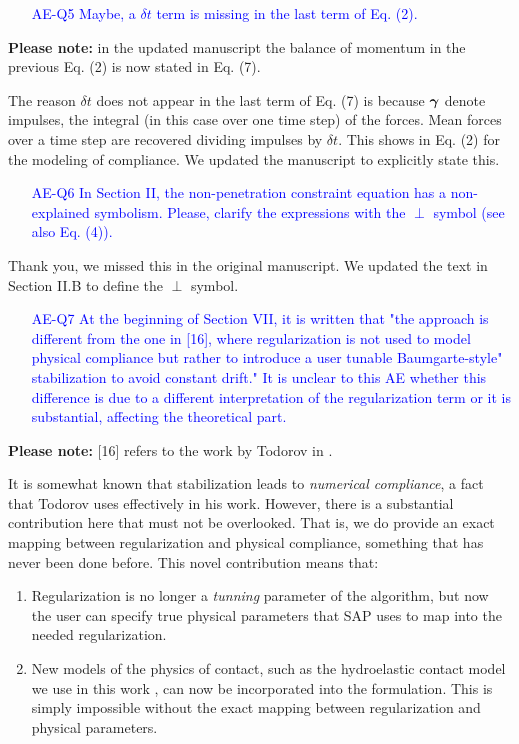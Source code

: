 \textcolor{blue}{\begin{itemize}
\item[AE-Q5] Maybe, a $\delta t$ term is missing in the last term of Eq. (2).
\end{itemize}} 

\textbf{Please note:} in the updated manuscript the balance of momentum in the
previous Eq. (2) is now stated in Eq. (7).

The reason $\delta t$ does not appear in the last term of Eq. (7) is because
${\bm\gamma}$ denote impulses, the integral (in this case over one time step) of the
forces. Mean forces over a time step are recovered dividing impulses by $\delta
t$. This shows in Eq. (2) for the modeling of compliance. We updated the
manuscript to explicitly state this.

\textcolor{blue}{\begin{itemize}
\item[AE-Q6] In Section II, the non-penetration constraint equation has a non-explained
symbolism. Please, clarify the expressions with the $\perp$ symbol (see also Eq.
(4)).\end{itemize}}

Thank you, we missed this in the original manuscript. We updated the text in
Section II.B to define the $\perp$ symbol.
    
\textcolor{blue}{\begin{itemize}
\item[AE-Q7] At the beginning of Section VII, it is written that "the approach is
different from the one in [16], where regularization is not used to model
physical compliance but rather to introduce a user tunable Baumgarte-style"
stabilization to avoid constant drift." It is unclear to this AE whether this
difference is due to a different interpretation of the regularization term or it
is substantial, affecting the theoretical part.\end{itemize}} 

\textbf{Please note:} [16] refers to the work by Todorov in
\cite{bib:todorov2014}.

It is somewhat known that stabilization leads to \emph{numerical compliance}, a
fact that Todorov uses effectively in his work. However, there is a substantial
contribution here that must not be overlooked. That is, we do provide an exact
mapping between regularization and physical compliance, something that has never
been done before. This novel contribution means that:
\begin{enumerate}
    \item Regularization is no longer a \emph{tunning} parameter of the
    algorithm, but now the user can specify true physical parameters that SAP
    uses to map into the needed regularization.
    \item New models of the physics of contact, such as the hydroelastic contact
    model we use in this work
    \cite{bib:elandt2019pressure,bib:masterjohn2021discrete}, can now be
    incorporated into the formulation. This is simply impossible without the
    exact mapping between regularization and physical parameters.
\end{enumerate}

